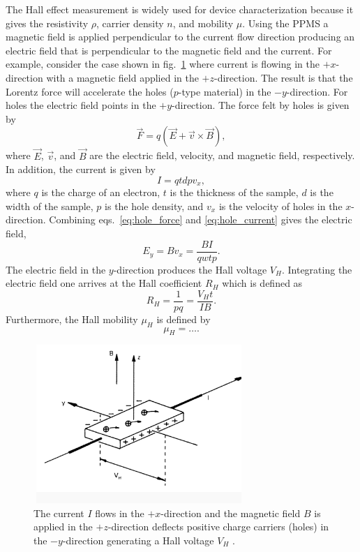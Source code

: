\noindent The Hall effect measurement is widely used for device characterization because it gives the resistivity $\rho$, carrier density $n$, and mobility $\mu$. Using the \acs{PPMS} a magnetic field is applied perpendicular to the current flow direction producing an electric field that is perpendicular to the magnetic field and the current. For example, consider the case shown in fig.~\ref{fig:hall_diagram} where current is flowing in the $+x$-direction with a magnetic field applied in the $+z$-direction. The result is that the Lorentz force will accelerate the holes ($p$-type material) in the $-y$-direction. For holes the electric field points in the $+y$-direction. The force felt by holes is given by
\begin{equation}\label{eq:hole_force}
	\vec{F} = q\left(\vec{E} + \vec{v}\times \vec{B}\right),
\end{equation}
where $\vec{E}$, $\vec{v}$, and $\vec{B}$ are the electric field, velocity, and magnetic field, respectively. In addition, the current is given by
\begin{equation}\label{eq:hole_current}
	I = q t d p v_x,
\end{equation}
where $q$ is the charge of an electron, $t$ is the thickness of the sample, $d$ is the width of the sample, $p$ is the hole density, and $v_x$ is the velocity of holes in the $x$-direction. Combining eqs.~\ref{eq:hole_force} and \ref{eq:hole_current} gives the electric field,
\begin{equation}\label{eq:efield}
	E_y = B v_x = \frac{B I}{q w t p}.
\end{equation}
The electric field in the $y$-direction produces the Hall voltage $V_H$. Integrating the electric field one arrives at the Hall coefficient $R_H$ which is defined as 
\begin{equation}\label{eq:hall_coeff}
	R_H = \frac{1}{p q} = \frac{V_H t}{I B}.
\end{equation}
Furthermore, the Hall mobility $\mu_H$ is defined by 
\begin{equation}\label{eq:mu_hall}
	\mu_H = \ldots.
\end{equation}
\begin{figure}[ht]
	\centering
	\includegraphics[height=6cm,width=8cm]{figs/results/hall_diagram}
	\caption[Hall effect measurement diagram]{The current $I$ flows in the $+x$-direction and the magnetic field $B$ is applied in the $+z$-direction deflects positive charge carriers (holes) in the $-y$-direction generating a Hall voltage $V_H$ \cite{HallDiagram,HallEffectNIST}.}
	\label{fig:hall_diagram}
\end{figure}


